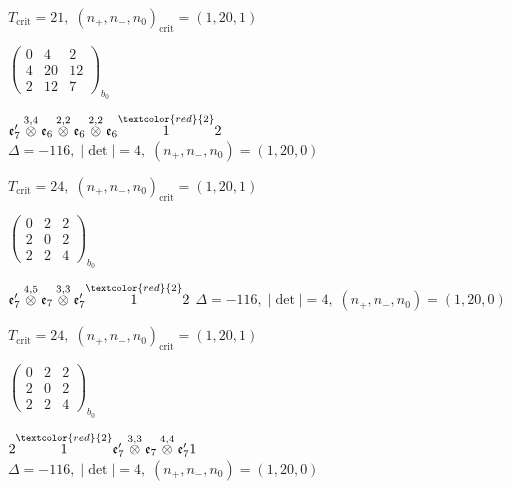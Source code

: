 \documentclass[10pt]{article}
\begin{document}
\hspace{1em}$T_{\text{crit}}=21,\; (n_+,n_-,n_0)_{\text{crit}}=(1,20,1)$

\hspace{2em}$\left(\begin{smallmatrix}0 & 4 & 2 \\ 4 & 20 & 12 \\ 2 & 12 & 7\end{smallmatrix}\right)_{\!b_0}$

\smallskip

$\mathfrak{e}_7'\overset{3,4}{\otimes}\mathfrak{e}_6\overset{2,2}{\otimes}\mathfrak{e}_6\overset{2,2}{\otimes}\mathfrak{e}_6\overset{\textcolor{red}{2}}{1}2$ \quad $\Delta=-116,\; |\det|=4,\; (n_+,n_-,n_0)=(1,20,0)$

\hspace{1em}$T_{\text{crit}}=24,\; (n_+,n_-,n_0)_{\text{crit}}=(1,20,1)$

\hspace{2em}$\left(\begin{smallmatrix}0 & 2 & 2 \\ 2 & 0 & 2 \\ 2 & 2 & 4\end{smallmatrix}\right)_{\!b_0}$

\smallskip

$\mathfrak{e}_7'\overset{4,5}{\otimes}\mathfrak{e}_7\overset{3,3}{\otimes}\mathfrak{e}_7'\overset{\textcolor{red}{2}}{1}2$ \quad $\Delta=-116,\; |\det|=4,\; (n_+,n_-,n_0)=(1,20,0)$

\hspace{1em}$T_{\text{crit}}=24,\; (n_+,n_-,n_0)_{\text{crit}}=(1,20,1)$

\hspace{2em}$\left(\begin{smallmatrix}0 & 2 & 2 \\ 2 & 0 & 2 \\ 2 & 2 & 4\end{smallmatrix}\right)_{\!b_0}$

\smallskip

$2\overset{\textcolor{red}{2}}{1}\mathfrak{e}_7'\overset{3,3}{\otimes}\mathfrak{e}_7\overset{4,4}{\otimes}\mathfrak{e}_7'1$ \quad $\Delta=-116,\; |\det|=4,\; (n_+,n_-,n_0)=(1,20,0)$
\end{document}
